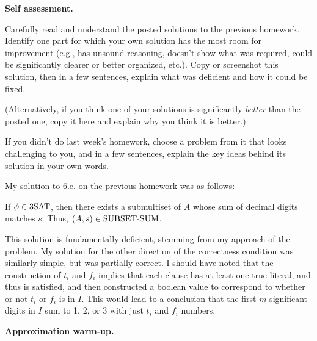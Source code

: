 \documentclass[11pt,addpoints,answers]{exam}
\begin{document}
\begin{questions}

  \question[10] \textbf{Self assessment.} \nopagebreak
  
  Carefully read and understand the posted solutions to the previous homework.
  Identify one part for which your own solution has the most room for improvement (e.g., has unsound reasoning, doesn’t show what was required, could be significantly clearer or better organized, etc.).
  Copy or screenshot this solution, then in a few sentences, explain what was deficient and how it could be fixed.

  (Alternatively, if you think one of your solutions is significantly \emph{better} than the posted one, copy it here and explain why you think it is better.)

  If you didn't do last week's homework, choose a problem from it that looks challenging to you, and in a few sentences, explain the key ideas behind its solution in your own words.

  \begin{solution} 
  My solution to 6.e. on the previous homework was as follows:
  \begin{solution}
  If $\phi \in \text{3SAT}$, then there exists a submultiset of $A$ whose sum of decimal digits matches $s$. Thus, $(A,s)\in \text{SUBSET-SUM}$.
  
  \end{solution}
  This solution is fundamentally deficient, stemming from my approach of the problem. My solution for the other direction of the correctness condition was similarly simple, but was partially correct. I should have noted that the construction of $t_i$ and $f_i$ implies that each clause has at least one true literal, and thus is satisfied, and then constructed a boolean value to correspond to whether or not $t_i$ or $f_i$ is in $I$. This would lead to a conclusion that the first $m$ significant digits in $I$ sum to 1, 2, or 3 with just $t_i$ and $f_i$ numbers.
  \end{solution}

  \question \textbf{Approximation warm-up.}
\end{questions}
\end{document}
